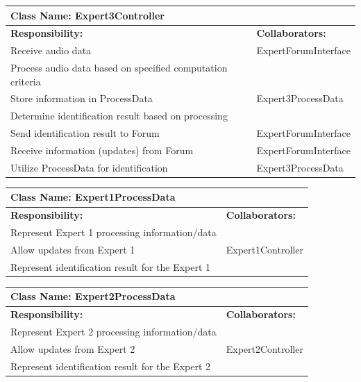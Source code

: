 \documentclass[]{article}
\begin{document}
	\begin{table}[ht]
		\centering
		\begin{tabular}{|p{5cm}|p{5cm}|}
		\hline 
		 \multicolumn{2}{|l|}{\textbf{Class Name: Expert3Controller}} \\
		\hline
		\textbf{Responsibility:} & \textbf{Collaborators:} \\
		\hline
		Receive audio data & ExpertForumInterface \\
		\hline
		Process audio data based on specified computation criteria &  \\
		\hline
		Store information in ProcessData & Expert3ProcessData \\
		\hline
		Determine identification result based on processing &  \\
		\hline
		Send identification result to Forum & ExpertForumInterface \\
		\hline
		Receive information (updates) from Forum & ExpertForumInterface \\
		\hline
		Utilize ProcessData for identification & Expert3ProcessData \\
		\hline
		\end{tabular}
	\end{table}	
	
	\begin{table}[ht]
		\centering
		\begin{tabular}{|p{5cm}|p{5cm}|}
		\hline 
		 \multicolumn{2}{|l|}{\textbf{Class Name: Expert1ProcessData}} \\
		\hline
		\textbf{Responsibility:} & \textbf{Collaborators:} \\
		\hline
		Represent Expert 1 processing information/data &  \\
		\hline
		Allow updates from Expert 1 & Expert1Controller \\
		\hline
		Represent identification result for the Expert 1 &  \\
		\hline
		\end{tabular}
	\end{table}
	
\newpage
	\begin{table}[ht]
		\centering
		\begin{tabular}{|p{5cm}|p{5cm}|}
		\hline 
		 \multicolumn{2}{|l|}{\textbf{Class Name: Expert2ProcessData}} \\
		\hline
		\textbf{Responsibility:} & \textbf{Collaborators:} \\
		\hline
		Represent Expert 2 processing information/data &  \\
		\hline
		Allow updates from Expert 2 & Expert2Controller \\
		\hline
		Represent identification result for the Expert 2 &  \\
		\hline
		\end{tabular}
	\end{table}
	
\end{document}
